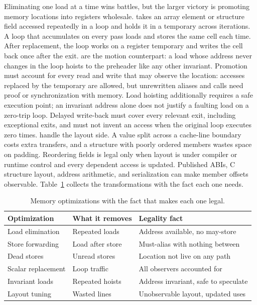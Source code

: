 Eliminating one load at a time wins battles, but the larger victory is promoting memory locations into registers wholesale.
 takes an array element or structure field accessed repeatedly in a loop and holds it in a temporary across iterations.
A loop that accumulates  on every pass loads and stores the same cell each time.
After replacement, the loop works on a register temporary and writes the cell back once after the exit.
 are the motion counterpart: a load whose address never changes in the loop hoists to the preheader like any other invariant.
Promotion must account for every read and write that may observe the location: accesses replaced by the temporary are allowed, but unrewritten aliases and calls need proof or synchronization with memory.
Load hoisting additionally requires a safe execution point; an invariant address alone does not justify a faulting load on a zero-trip loop.
Delayed write-back must cover every relevant exit, including exceptional exits, and must not invent an access when the original loop executes zero times.
 handle the layout side.
A value split across a cache-line boundary costs extra transfers, and a structure with poorly ordered members wastes space on padding.
Reordering fields is legal only when layout is under compiler or runtime control and every dependent access is updated.
Published ABIs, C structure layout, address arithmetic, and serialization can make member offsets observable.
Table~\ref{tab:ch21-menu} collects the transformations with the fact each one needs.

\begin{table}
  \centering
  \caption{Memory optimizations with the fact that makes each one legal.}
  \label{tab:ch21-menu}
  \begin{tabular}{lll}
    \toprule
    Optimization & What it removes & Legality fact \\
    \midrule
    Load elimination & Repeated loads & Address available, no may-store \\
    Store forwarding & Load after store & Must-alias with nothing between \\
    Dead stores & Unread stores & Location not live on any path \\
    Scalar replacement & Loop traffic & All observers accounted for \\
    Invariant loads & Repeated hoists & Address invariant, safe to speculate \\
    Layout tuning & Wasted lines & Unobservable layout, updated uses \\
    \bottomrule
  \end{tabular}
\end{table}

